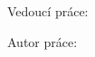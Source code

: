 \begin{titlepage}
	\centering

  \vfill

	{\LARGE \insertinstitution \par}
	{\Large \insertfaculty \par}

	\vfill

	{\huge\bfseries \inserttitle \par}
	{\Large \insertpapertype \par}

  \vfill

  {\Large Vedoucí práce: \insertsupervisor \par}
	{\Large Autor práce: {\insertauthor} \par}

	\vspace{1.5cm}

	{\scshape\large \insertlocation ~ \the\year \par}

  \vfill
\end{titlepage}
